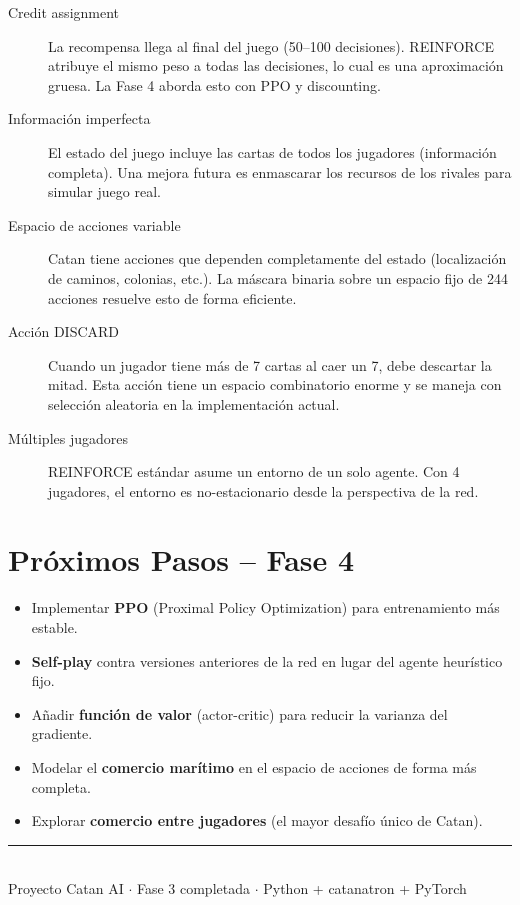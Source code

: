 \documentclass[11pt, a4paper]{article}
\begin{document}
\begin{description}
  \item[Credit assignment] La recompensa llega al final del juego
        (50--100 decisiones). REINFORCE atribuye el mismo peso a todas las
        decisiones, lo cual es una aproximación gruesa. La Fase 4 aborda esto
        con PPO y discounting.

  \item[Información imperfecta] El estado del juego incluye las cartas de todos
        los jugadores (información completa). Una mejora futura es enmascarar
        los recursos de los rivales para simular juego real.

  \item[Espacio de acciones variable] Catan tiene acciones que dependen
        completamente del estado (localización de caminos, colonias, etc.).
        La máscara binaria sobre un espacio fijo de 244 acciones resuelve
        esto de forma eficiente.

  \item[Acción DISCARD] Cuando un jugador tiene más de 7 cartas al caer un 7,
        debe descartar la mitad. Esta acción tiene un espacio combinatorio enorme
        y se maneja con selección aleatoria en la implementación actual.

  \item[Múltiples jugadores] REINFORCE estándar asume un entorno de un solo
        agente. Con 4 jugadores, el entorno es no-estacionario desde la
        perspectiva de la red.
\end{description}


\section{Próximos Pasos -- Fase 4}

\begin{itemize}
  \item Implementar \textbf{PPO} (Proximal Policy Optimization) para
        entrenamiento más estable.
  \item \textbf{Self-play} contra versiones anteriores de la red en lugar
        del agente heurístico fijo.
  \item Añadir \textbf{función de valor} (actor-critic) para reducir la
        varianza del gradiente.
  \item Modelar el \textbf{comercio marítimo} en el espacio de acciones de
        forma más completa.
  \item Explorar \textbf{comercio entre jugadores} (el mayor desafío único de Catan).
\end{itemize}

\vfill
\begin{center}
  \rule{0.5\textwidth}{0.4pt}\\[0.3em]
  \small Proyecto Catan AI $\cdot$ Fase 3 completada $\cdot$
  Python + catanatron + PyTorch
\end{center}
\end{document}
